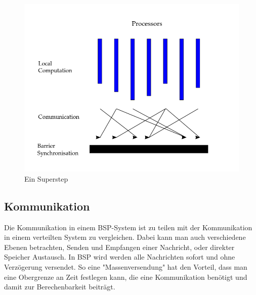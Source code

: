 \documentclass[a4paper,10pt]{scrartcl}
\begin{document}
\begin{figure}[h]
	\centering \includegraphics[scale = 0.4]{superstep.png}
	
	\caption{Ein Superstep}
\end{figure}

\newpage

\subsection{Kommunikation}
Die Kommunikation in einem BSP-System ist zu teilen mit der Kommunikation in einem verteilten System zu vergleichen. Dabei kann man auch verschiedene Ebenen betrachten, Senden und Empfangen einer Nachricht, oder direkter Speicher Austausch. In BSP wird werden alle Nachrichten sofort und ohne Verzögerung versendet. So eine "Massenversendung" hat den Vorteil, dass man eine Obergrenze an Zeit festlegen kann, die eine Kommunikation benötigt und damit zur Berechenbarkeit beiträgt. 
\end{document}
